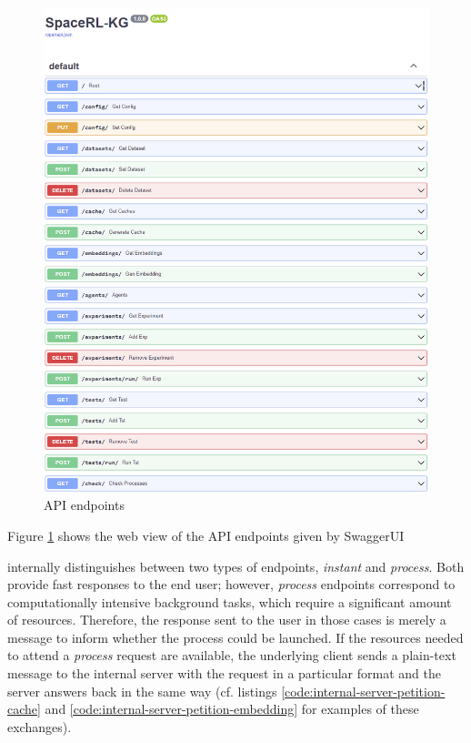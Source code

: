\begin{figure}[!h]
    \centering
    \includegraphics[width=.8\textwidth]{fig/framework/API/api_docs.png}
    \caption{API endpoints}
    \label{fig:endpoints}
\end{figure}

Figure \ref{fig:endpoints} shows the web view of the API endpoints given by SwaggerUI 

\toolname{} internally distinguishes  between two types of endpoints, \emph{instant} and \emph{process}. Both provide fast responses to the end user; however, \emph{process} endpoints correspond to computationally intensive background tasks, which require a significant amount of resources. Therefore, the response sent to the user in those cases is merely a message to inform whether the process could be launched. If the resources needed to attend a \emph{process} request are available, the  underlying client sends a plain-text message to the internal server with the request in a particular format and the server answers back in the same way (cf. listings \ref{code:internal-server-petition-cache} and \ref{code:internal-server-petition-embedding} for examples of these exchanges). 



